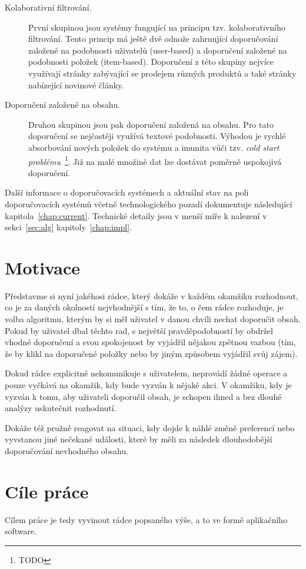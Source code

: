 \documentclass[thesis=M,czech]{FITthesis}[2014/05/07]
\begin{document}
\begin{introduction}
\begin{description}
	\item[Kolaborativní filtrování.] První skupinou jsou systémy fungující na principu tzv. kolaborativního filtrování. Tento princip má ještě dvě odnože zahrnující doporučování založené na podobnosti uživatelů (user-based) a doporučení založené na podobnosti položek (item-based). Doporučení z této skupiny nejvíce využívají stránky zabývající se prodejem různých produktů a také stránky nabízející novinové články.
	\item[Doporučení založené na obsahu.] Druhou skupinou jsou pak doporučení založená na obsahu. Pro tato doporučení se nejčastěji využívá textové podobnosti. Výhodou je rychlé absorbování nových položek do systému a imunita vůči tzv. \emph{cold start problému}~\footnote{TODO}. Již na malé množině dat lze dostávat poměrně uspokojivá doporučení.
\end{description}
 
 Další informace o doporučovacích systémech a aktuální stav na poli doporučovacích systémů včetně technologického pozadí dokumentuje následující kapitola~\ref{chap:current}. Technické detaily jsou v menší míře k nalezení v sekci~\ref{sec:alg} kapitoly~\ref{chap:impl}.

\section{Motivace} 	
\label{sec:motivation}
		
	Představme si nyní jakéhosi rádce, který dokáže v každém okamžiku rozhodnout, co je za daných okolností nejvhodnější s tím, že to, o čem rádce rozhoduje, je volba algoritmu, kterým by si měl uživatel v danou chvíli nechat doporučit obsah. Pokud by uživatel dbal těchto rad, s největší pravděpodobností by obdržel vhodné doporučení a svou spokojenost by vyjádřil nějakou zpětnou vazbou (tím, že by klikl na doporučené položky nebo by jiným způsobem vyjádřil svůj zájem).
	
	Dokud rádce explicitně nekomunikuje s uživatelem, neprovádí žádné operace a pouze vyčkává na okamžik, kdy bude vyzván k nějaké akci. V okamžiku, kdy je vyzván k tomu, aby uživateli doporučil obsah, je schopen ihned a bez dlouhé analýzy uskutečnit rozhodnutí.
	
	Dokáže též pružně reagovat na situaci, kdy dojde k náhlé změně preferencí nebo vyvstanou jiné nečekané události, které by měli za následek dlouhodobější doporučování nevhodného obsahu.
	
\section{Cíle práce}
\label{sec:objectives}
	Cílem práce je tedy vyvinout rádce popsaného výše, a to ve formě aplikačního software. 


\end{introduction}
\end{document}
